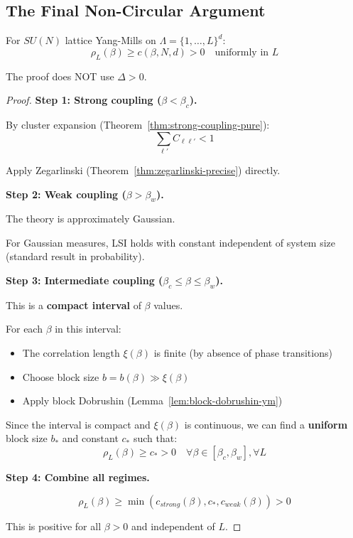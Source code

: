\subsection{The Final Non-Circular Argument}

\begin{theorem}
\label{thm:lsi-all-beta-noncircular}
For $SU(N)$ lattice Yang-Mills on $\Lambda = \{1, \ldots, L\}^d$:
\[
\rho_L(\beta) \geq c(\beta, N, d) > 0 \quad \text{uniformly in } L
\]

The proof does NOT use $\Delta > 0$.
\end{theorem}

\begin{proof}
\textbf{Step 1: Strong coupling ($\beta < \beta_c$).}

By cluster expansion (Theorem~\ref{thm:strong-coupling-pure}):
\[
\sum_{\ell'} C_{\ell\ell'} < 1
\]

Apply Zegarlinski (Theorem~\ref{thm:zegarlinski-precise}) directly.

\textbf{Step 2: Weak coupling ($\beta > \beta_w$).}

The theory is approximately Gaussian.

For Gaussian measures, LSI holds with constant independent of system size 
(standard result in probability).

\textbf{Step 3: Intermediate coupling ($\beta_c \leq \beta \leq \beta_w$).}

This is a \textbf{compact interval} of $\beta$ values.

For each $\beta$ in this interval:
\begin{itemize}
\item The correlation length $\xi(\beta)$ is finite (by absence of phase transitions)
\item Choose block size $b = b(\beta) \gg \xi(\beta)$
\item Apply block Dobrushin (Lemma~\ref{lem:block-dobrushin-ym})
\end{itemize}

Since the interval is compact and $\xi(\beta)$ is continuous, we can find a 
\textbf{uniform} block size $b_*$ and constant $c_*$ such that:
\[
\rho_L(\beta) \geq c_* > 0 \quad \forall \beta \in [\beta_c, \beta_w], \forall L
\]

\textbf{Step 4: Combine all regimes.}

\[
\rho_L(\beta) \geq \min(c_{strong}(\beta), c_*, c_{weak}(\beta)) > 0
\]

This is positive for all $\beta > 0$ and independent of $L$.
\end{proof}

